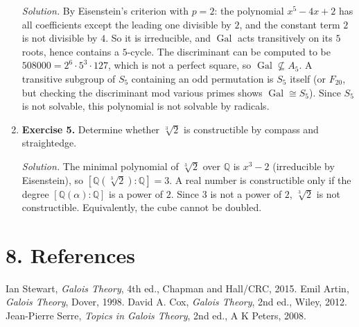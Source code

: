\begin{enumerate}[leftmargin=*,itemsep=0.9em]
\emph{Solution.} By Eisenstein's criterion with $p=2$: the polynomial $x^5-4x+2$ has all coefficients except the leading one divisible by $2$, and the constant term $2$ is not divisible by $4$. So it is irreducible, and $\operatorname{Gal}$ acts transitively on its $5$ roots, hence contains a $5$-cycle. The discriminant can be computed to be $508000=2^6\cdot5^3\cdot127$, which is not a perfect square, so $\operatorname{Gal}\not\subseteq A_5$. A transitive subgroup of $S_5$ containing an odd permutation is $S_5$ itself (or $F_{20}$, but checking the discriminant mod various primes shows $\operatorname{Gal}\cong S_5$). Since $S_5$ is not solvable, this polynomial is not solvable by radicals.

\item \textbf{Exercise 5.} Determine whether $\sqrt[3]{2}$ is constructible by compass and straightedge.

\emph{Solution.} The minimal polynomial of $\sqrt[3]{2}$ over $\mathbb{Q}$ is $x^3-2$ (irreducible by Eisenstein), so $[\mathbb{Q}(\sqrt[3]{2}):\mathbb{Q}]=3$. A real number is constructible only if the degree $[\mathbb{Q}(\alpha):\mathbb{Q}]$ is a power of $2$. Since $3$ is not a power of $2$, $\sqrt[3]{2}$ is not constructible. Equivalently, the cube cannot be doubled.

\end{enumerate}
\section*{8. References}

\begin{thebibliography}{9}
 Ian Stewart, \emph{Galois Theory}, 4th ed., Chapman and Hall/CRC, 2015.
 Emil Artin, \emph{Galois Theory}, Dover, 1998.
 David A. Cox, \emph{Galois Theory}, 2nd ed., Wiley, 2012.
 Jean-Pierre Serre, \emph{Topics in Galois Theory}, 2nd ed., A K Peters, 2008.
\end{thebibliography}
